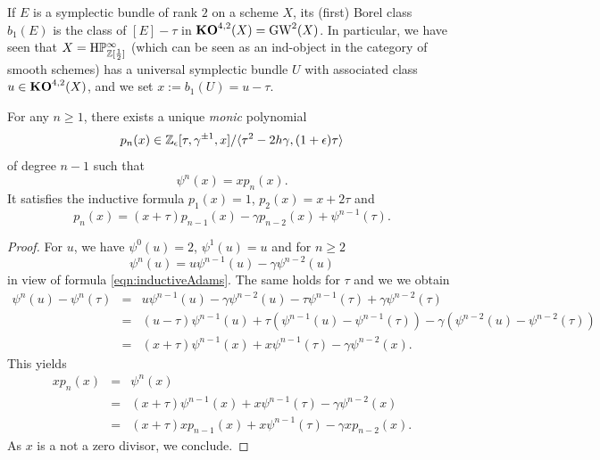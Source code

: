 If $E$ is a symplectic bundle of rank $2$ on a scheme $X$, its (first) Borel class $b_1(E)$ is the class of $[E]-\tau$ in $\mathbf{KO}^{4,2}(X)=\operatorname{GW}^2(X)$. In particular, we have seen that $X=\mathrm{H}\mathbb P^{\infty}_{\mathbb{Z}[\frac 12]}$ (which can be seen as an ind-object in the category of smooth schemes) has a universal symplectic bundle $U$ with associated class $u\in \mathbf{KO}^{4,2}(X)$, and we set $x:=b_1(U)=u-\tau$. 

\begin{lm}
For any $n\geq 1$, there exists a unique \emph{monic} polynomial 
\[
p_n(x)\in \mathbb{Z}_{\epsilon}[\tau,\gamma^{\pm 1},x]/\langle \tau^2-2h\gamma,(1+\epsilon)\tau\rangle
\] 
of degree $n-1$ such that 
\[
\psi^n(x)=xp_n(x).
\]
It satisfies the inductive formula $p_1(x)=1$, $p_2(x)=x+2\tau$ and
\[
p_n(x)=(x+\tau)p_{n-1}(x)-\gamma p_{n-2}(x)+\psi^{n-1}(\tau).
\]
\end{lm}

\begin{proof}
For $u$, we have $\psi^0(u)=2$, $\psi^1(u)=u$ and for $n\geq 2$
\[
\psi^n(u)=u\psi^{n-1}(u)-\gamma\psi^{n-2}(u)
\]
in view of formula \eqref{eqn:inductiveAdams}. The same holds for $\tau$ and we we obtain
\begin{eqnarray*}
\psi^n(u)-\psi^n(\tau) & = & u\psi^{n-1}(u)-\gamma\psi^{n-2}(u)-\tau\psi^{n-1}(\tau)+\gamma\psi^{n-2}(\tau) \\
 & = & (u-\tau)\psi^{n-1}(u)+\tau(\psi^{n-1}(u)-\psi^{n-1}(\tau))-\gamma(\psi^{n-2}(u)-\psi^{n-2}(\tau)) \\
 & = & (x+\tau)\psi^{n-1}(x)+x\psi^{n-1}(\tau)-\gamma\psi^{n-2}(x).
\end{eqnarray*}
This yields 
\begin{eqnarray*}
xp_n(x) & = & \psi^n(x) \\
 & = & (x+\tau)\psi^{n-1}(x)+x\psi^{n-1}(\tau)-\gamma\psi^{n-2}(x) \\
 & = & (x+\tau)xp_{n-1}(x)+x\psi^{n-1}(\tau)-\gamma x p_{n-2}(x).
\end{eqnarray*}
As $x$ is a not a zero divisor, we conclude.
\end{proof}

